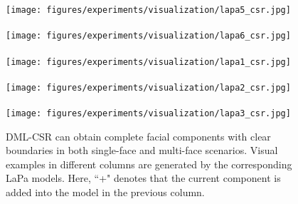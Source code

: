\documentclass[10pt,twocolumn,letterpaper]{article}
\begin{document}
\begin{figure}
{\begin{minipage}[t]{0.14\linewidth}
    \texttt{[image: figures/experiments/visualization/lapa5\_csr.jpg]}
   \\ \\[-2.5ex]
    \texttt{[image: figures/experiments/visualization/lapa6\_csr.jpg]}
   \\ \\[-2.5ex]
    \texttt{[image: figures/experiments/visualization/lapa1\_csr.jpg]}
   \\ \\[-2.5ex]
    \texttt{[image: figures/experiments/visualization/lapa2\_csr.jpg]}
   \\ \\[-2.5ex]
    \texttt{[image: figures/experiments/visualization/lapa3\_csr.jpg]}
    \end{minipage}
}
\vspace{-2.5mm}
\caption{DML-CSR can obtain complete facial components with clear boundaries in both single-face and multi-face scenarios. Visual examples in different columns are generated by the corresponding LaPa models. Here, ``+" denotes that the current component is added into the model in the previous column.}
\vspace{-6mm}
\label{fig:visualization}
\end{figure}
\end{document}
